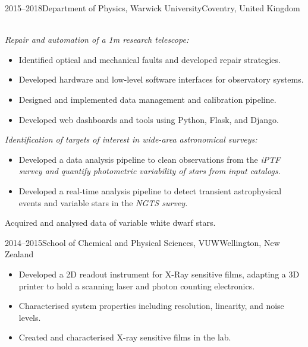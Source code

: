 \documentclass[print]{cv-style}
\begin{document}
\begin{entrylist}
\entry
  {2015--2018}{Department of Physics, Warwick University}{Coventry, United Kingdom}
  {\\
  \vspace{-3mm}
  \it{Repair and automation of a 1m research telescope:}\vspace{-1mm}\\
  \begin{itemize}
	\item Identified optical and mechanical faults and developed repair strategies.
    \item Developed hardware and low-level software interfaces for observatory systems.
    \item Designed and implemented data management and calibration pipeline.
    \item Developed web dashboards and tools using Python, Flask, and Django.
  \end{itemize}
  \it{Identification of targets of interest in wide-area astronomical surveys:}
  \begin{itemize}
	\item Developed a data analysis pipeline to clean observations from the \it{iPTF} survey and quantify photometric variability of stars from input catalogs.
    \item Developed a real-time analysis pipeline to detect transient astrophysical events and variable stars in the \it{NGTS} survey.
  \end{itemize}
  Acquired and analysed data of variable white dwarf stars.
}
\entry
  {2014--2015}{School of Chemical and Physical Sciences, VUW}{Wellington, New Zealand}
  {
  \begin{itemize}
    \item Developed a 2D readout instrument for X-Ray sensitive films, adapting a 3D printer to hold a scanning laser and photon counting electronics.
	\item Characterised system properties including resolution, linearity, and noise levels.
	\item Created and characterised X-ray sensitive films in the lab.
  \end{itemize}
}

\end{entrylist}
\end{document}
